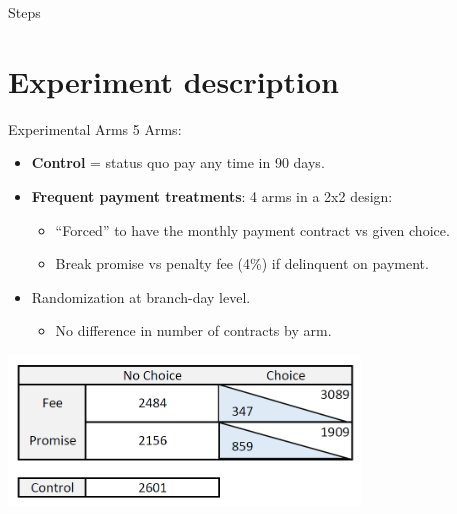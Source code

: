 \documentclass[9pt]{beamer}
\begin{document}
	\begin{frame}[t]{Steps}
	\hfill
	\parbox[t]{.95\textwidth}{
		\begin{minipage}[c][0.75\textheight]{\textwidth}
			\tableofcontents[hideallsubsections]	
	\end{minipage}}
	\hfill
\end{frame}






\section{Experiment description}

\begin{frame}{Experimental Arms}
     5 Arms:
        \begin{itemize}
            \item \textbf{Control} = status quo pay any time in 90 days.
            \vfill
            \item \textbf{Frequent payment treatments}: 4 arms in a 2x2 design: 
            \vfill
            \begin{itemize}
                \item ``Forced'' to have the monthly payment contract vs given choice.
                \vfill
                \item  Break promise vs penalty fee (4\%) if delinquent on payment.
            \end{itemize}
            \vfill
            \item Randomization at branch-day level.
                \begin{itemize}
                    \item No difference in number of contracts by arm.
                \end{itemize}
        \end{itemize}
    \vfill
    \begin{center}
        \centering
        \includegraphics[width=0.70\textwidth]{Figuras/exp_arms.PNG}
    \end{center}
\end{frame}
\end{document}

